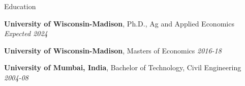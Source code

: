 \documentclass{resume} %
\begin{document}

\begin{rSection}{Education}

{\bf University of Wisconsin-Madison}, Ph.D., Ag and Applied Economics \hfill {\em Expected 2024} 


{\bf University of Wisconsin-Madison}, Masters of Economics \hfill {\em 2016-18}

{\bf University of Mumbai, India}, Bachelor of Technology, Civil Engineering \hfill {\em 2004-08}

\end{rSection}


	
\end{document}
